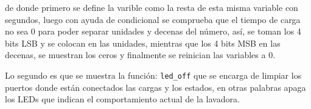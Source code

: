 
de donde primero se define la varible como la resta de esta misma variable con segundos, luego con ayuda de condicional se comprueba que el tiempo de carga no sea 0 para poder separar unidades y decenas del número, así, se toman los 4 bits LSB y se colocan en las unidades, mientras que los 4 bits MSB en las decenas, se muestran los ceros y finalmente se reinician las variables a 0.


Lo segundo es que se muestra la función: \texttt{led\_off} que se encarga de limpiar los puertos donde están conectados las cargas y los estados, en otras palabras apaga los LEDs que indican el comportamiento actual de la lavadora.